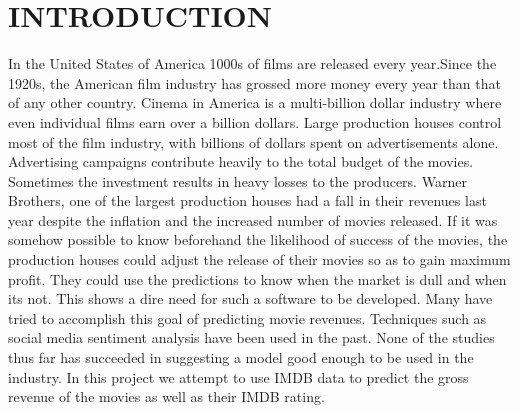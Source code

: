 \chapter{INTRODUCTION}
In the United States of America 1000s of films are released every year.Since the 1920s, the American film industry has grossed more money every year than that of any other country. Cinema in America is a multi-billion dollar industry where even individual films earn over a billion dollars. Large production houses control most of the film industry, with billions of dollars spent on advertisements alone. Advertising campaigns contribute heavily to the total budget of the movies. Sometimes the investment results in heavy losses to the producers.
Warner Brothers, one of the largest production houses had a fall in their revenues last year despite the inflation and the increased number of movies released. If it was somehow possible to know beforehand the likelihood of success of the movies, the production houses could adjust the release of their movies so as to gain maximum profit. They could use the predictions to know when the market is dull and when its not.
 This shows a dire need for such a software to be developed. Many have tried to accomplish this goal of predicting movie revenues. Techniques such as social media sentiment analysis have been used in the past. None of the studies thus far has succeeded in suggesting a model good enough to be used in the industry.
In this project we attempt to use IMDB data to predict the gross revenue of the movies as well as their IMDB rating.


\clearpage
